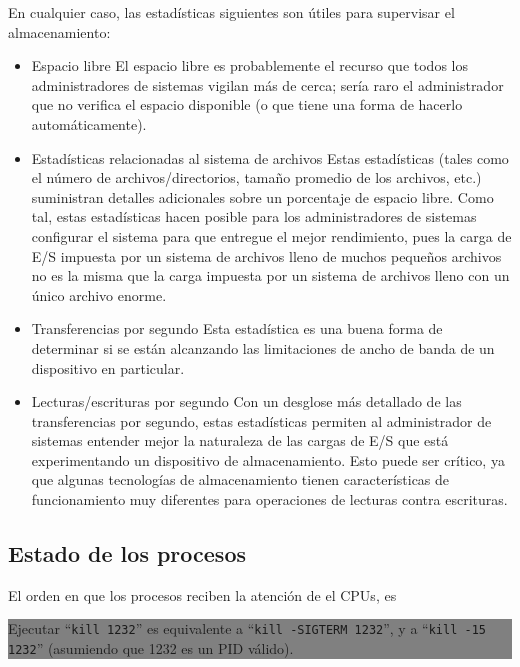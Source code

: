 \documentclass[12pt]{article}
\begin{document}
En cualquier caso, las estadísticas siguientes son útiles para supervisar el almacenamiento:

\begin{itemize}
\item Espacio libre
El espacio libre es probablemente el recurso que todos los administradores de sistemas vigilan más de cerca; sería raro el administrador que no verifica el espacio disponible (o que tiene una forma de hacerlo automáticamente).

\item Estadísticas relacionadas al sistema de archivos
Estas estadísticas (tales como el número de archivos/directorios, tamaño promedio de los archivos, etc.) suministran detalles adicionales sobre un porcentaje de espacio libre. Como tal, estas estadísticas hacen posible para los administradores de sistemas configurar el sistema para que entregue el mejor rendimiento, pues la carga de E/S impuesta por un sistema de archivos lleno de muchos pequeños archivos no es la misma que la carga impuesta por un sistema de archivos lleno con un único archivo enorme.

\item Transferencias por segundo
Esta estadística es una buena forma de determinar si se están alcanzando las limitaciones de ancho de banda de un dispositivo en particular.

\item Lecturas/escrituras por segundo
Con un desglose más detallado de las transferencias por segundo, estas estadísticas permiten al administrador de sistemas entender mejor la naturaleza de las cargas de E/S que está experimentando un dispositivo de almacenamiento. Esto puede ser crítico, ya que algunas tecnologías de almacenamiento tienen características de funcionamiento muy diferentes para operaciones de lecturas contra escrituras.
\end{itemize}






\subsection*{Estado de los procesos}

El orden en que los procesos reciben la atención de el CPUs, es 

\colorbox{grey}{\parbox[t]{0.95\linewidth}{ \vspace*{0.5cm} { 
{\bf }
Ejecutar ``\texttt{kill 1232}'' es equivalente a ``\texttt{kill -SIGTERM 
1232}'', y a ``\texttt{kill -15 1232}'' (asumiendo que 1232 es un PID 
válido). 
} \vspace*{0.5cm} } } 
\end{document}
